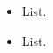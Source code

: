 \documentclass[ieee]{submit}
\begin{document}
\begin{itemize}
\item List.
\item List.
\end{itemize}

\begin{comment}
\wide[height=0.98\textheight]{rtl-flash}{{\tt g49\_flash\_read\_control}: flash circuit.}

\begin{figure*}[!ht]\centering
	\subfloat[state machine]{%
		\texttt{[image: state2.jpg]}
		\label{control:1}
	}
	\\
	\subfloat[transitions]{%
		\texttt{[image: state2-tran.jpg]}
		\label{control:2}
	}
	\caption{The state machine diagram for {\tt g49\_mid.vhd}.}
	\label{machine}
\end{figure*}

\begin{table}[htb]
\begin{center}\begin{tabular}{lr@{.}l}%
$F_{\text{max}}$& 50&69\,MHz \\%
Setup& 0&272\,ns\\%
Hold& 0&445\,ns\\
\end{tabular}\end{center}
\caption{{\tt g49\_mid.vhd}: timing values for the EP2C20F484C8N.}
\label{midtiming}
\end{table}

\begin{algorithm*}[h]
\DontPrintSemicolon
\KwIn{$A$}
\KwOut{$B$}
\BlankLine
\ForEach{$a \in A$}{
	\If{$a$}{$B$}
}
\KwRet{$B$}\;
\label{test}
\caption{test}
\end{algorithm*}

\begin{align} %
I(V)&=\frac{q^{2}}{4\pi^{2} \hbar d^{2}}\left(
\left( \phi -\alpha qV \right)
e^{-K\sqrt{\phi -\alpha qV}}\right.\nonumber\\
&\quad\left.-\left( \phi +\left( 1-\alpha \right)qV \right)
e^{-K\sqrt{\phi +\left( 1-\alpha  \right)qV}}
\right)\nonumber\\
&\text{where, }\nonumber\\
K&=\frac{2d}{\hbar}\sqrt{2m_{e}q}\nonumber\\
&\text{provided, }\nonumber\\
V &< \frac{\phi}{q}\label{sim}
\end{align}



\end{comment}

\received{\thedate}{\thedate}{\thedate}



\end{document}
